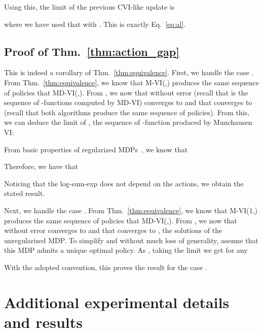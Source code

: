\documentclass{article}
\begin{document}
Using this, the limit of the previous CVI-like update is

where we have used that  with . This is exactly Eq.~\eqref{eq:al}.

\subsection{Proof of Thm.~\ref{thm:action_gap}}
\label{subappx:proof_action_gap}

This is indeed a corollary of Thm.~\ref{thm:equivalence}. First, we handle the case . From Thm.~\ref{thm:equivalence}, we know that M-VI(,) produces the same sequence of policies that MD-VI(,). From \cite[Thm.~2]{vieillard2020leverage}, we now that without error  (recall that  is the sequence of -functions computed by MD-VI) converges to  and that  converges to  (recall that both algorithms produce the same sequence of policies). From this, we can deduce the limit of , the sequence of -function produced by Munchausen VI:

From basic properties of regularized MDPs~\cite{geist2019theory}, we know that

Therefore, we have that

Noticing that the log-sum-exp does not depend on the actions, we obtain the stated result.

Next, we handle the case . From Thm.~\ref{thm:equivalence}, we know that M-VI(1,) produces the same sequence of policies that MD-VI(,). From \cite[Thm.~1]{vieillard2020leverage}, we now that without error  converges to  and that  converges to , the solutions of the unregularized MDP. To simplify and without much loss of generality, assume that this MDP admits a unique optimal policy. As , taking the limit we get for any 

With the adopted convention, this proves the result for the case .

\section{Additional experimental details and results}
\label{appx:exp}
\end{document}
